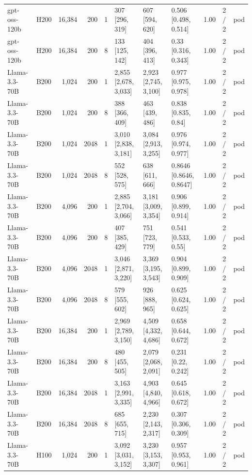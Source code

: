 \begin{landscape}
\begin{longtable}{llrrrlllrll}
gpt-oss-120b & H200 & 16,384 & 200 & 1 & 307 {[}296, 319{]} & 607 {[}594, 620{]} & 0.506 {[}0.498, 0.514{]} & 1.00 & 2 / 2 & pod \\
gpt-oss-120b & H200 & 16,384 & 200 & 8 & 133 {[}125, 142{]} & 404 {[}396, 413{]} & 0.33 {[}0.316, 0.343{]} & 1.00 & 2 / 2 & pod \\
Llama-3.3-70B & B200 & 1,024 & 200 & 1 & 2,855 {[}2,678, 3,033{]} & 2,923 {[}2,745, 3,100{]} & 0.977 {[}0.975, 0.978{]} & 1.00 & 2 / 2 & pod \\
Llama-3.3-70B & B200 & 1,024 & 200 & 8 & 388 {[}366, 409{]} & 463 {[}439, 486{]} & 0.838 {[}0.835, 0.84{]} & 1.00 & 2 / 2 & pod \\
Llama-3.3-70B & B200 & 1,024 & 2048 & 1 & 3,010 {[}2,838, 3,181{]} & 3,084 {[}2,913, 3,255{]} & 0.976 {[}0.974, 0.977{]} & 1.00 & 2 / 2 & pod \\
Llama-3.3-70B & B200 & 1,024 & 2048 & 8 & 552 {[}528, 575{]} & 638 {[}611, 666{]} & 0.8646 {[}0.8646, 0.8647{]} & 1.00 & 2 / 2 & pod \\
Llama-3.3-70B & B200 & 4,096 & 200 & 1 & 2,885 {[}2,704, 3,066{]} & 3,181 {[}3,009, 3,354{]} & 0.906 {[}0.899, 0.914{]} & 1.00 & 2 / 2 & pod \\
Llama-3.3-70B & B200 & 4,096 & 200 & 8 & 407 {[}385, 429{]} & 751 {[}723, 779{]} & 0.541 {[}0.533, 0.55{]} & 1.00 & 2 / 2 & pod \\
Llama-3.3-70B & B200 & 4,096 & 2048 & 1 & 3,046 {[}2,871, 3,220{]} & 3,369 {[}3,195, 3,543{]} & 0.904 {[}0.899, 0.909{]} & 1.00 & 2 / 2 & pod \\
Llama-3.3-70B & B200 & 4,096 & 2048 & 8 & 579 {[}555, 602{]} & 926 {[}888, 965{]} & 0.625 {[}0.624, 0.625{]} & 1.00 & 2 / 2 & pod \\
Llama-3.3-70B & B200 & 16,384 & 200 & 1 & 2,969 {[}2,789, 3,150{]} & 4,509 {[}4,332, 4,686{]} & 0.658 {[}0.644, 0.672{]} & 1.00 & 2 / 2 & pod \\
Llama-3.3-70B & B200 & 16,384 & 200 & 8 & 480 {[}455, 505{]} & 2,079 {[}2,068, 2,091{]} & 0.231 {[}0.22, 0.242{]} & 1.00 & 2 / 2 & pod \\
Llama-3.3-70B & B200 & 16,384 & 2048 & 1 & 3,163 {[}2,991, 3,335{]} & 4,903 {[}4,840, 4,966{]} & 0.645 {[}0.618, 0.672{]} & 1.00 & 2 / 2 & pod \\
Llama-3.3-70B & B200 & 16,384 & 2048 & 8 & 685 {[}655, 715{]} & 2,230 {[}2,143, 2,317{]} & 0.307 {[}0.306, 0.309{]} & 1.00 & 2 / 2 & pod \\
Llama-3.3-70B & H100 & 1,024 & 200 & 1 & 3,092 {[}3,031, 3,152{]} & 3,230 {[}3,153, 3,307{]} & 0.957 {[}0.953, 0.961{]} & 1.00 & 2 / 2 & pod \\

\end{longtable}
\end{landscape}
